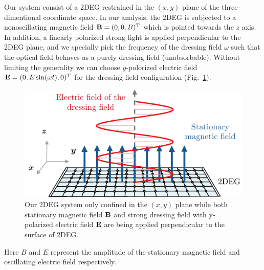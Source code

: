 
Our system consist of a 2DEG restrained in the $(x,y)$ plane of the three-dimentional coordinate space. In our analysis, the 2DEG is subjected to a nonoscillating magnetic field $\vb{B} = (0,0,B)^{\text{T}}$ which is pointed towards the $z$ axis. In addition, a linearly polarized strong light is applied perpendicular to the 2DEG plane, and we specially pick the frequency of the dressing field $\omega$ such that the optical field behaves as a purely dressing field (unabsorbable). Without limiting the generality we can choose $y$-polorized electric field $\vb{E} = (0,E\sin(\omega t),0)^{\text{T}}$ for the dressing field configuration (Fig.~\ref{fig_1}).
\begin{figure}[b]
\includegraphics[scale=0.9]{figures/fig_1}
\caption{\label{fig_1} Our 2DEG system only confined in the $(x,y)$ plane while both stationary magnetic field $\vb{B}$ and strong dressing field with y-polarized electric field $\vb{E}$ are being applied perpendicular to the surface of 2DEG.}
\end{figure}
Here $B$ and $E$ represent the amplitude of the stationary magnetic field and oscillating electric field respectively.

